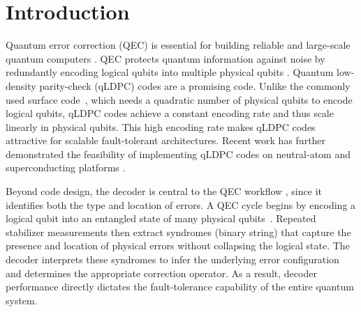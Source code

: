 \section{Introduction}

Quantum error correction (QEC) is essential for building reliable and large-scale quantum computers \cite{terhal2015quantum}. QEC protects quantum information against noise by redundantly encoding logical qubits into multiple physical qubits \cite{calderbank1996good}. Quantum low-density parity-check (qLDPC) codes are a promising code. Unlike the commonly used surface code~\cite{fowler2012surface,bonilla2021xzzx}, which needs a quadratic number of physical qubits to encode logical qubits, qLDPC codes achieve a constant encoding rate and thus scale linearly in physical qubits. This high encoding rate makes qLDPC codes attractive for scalable fault-tolerant architectures. Recent work has further demonstrated the feasibility of implementing qLDPC codes on neutral-atom and superconducting platforms \cite{xu2024constant,bbcode,wang2025demonstration}. 

Beyond code design, the decoder is central to the QEC workflow \cite{vittal2023astrea,alavisamani2024promatch,das2022lilliput,wu2025micro}, since it identifies both the type and location of errors. A QEC cycle begins by encoding a logical qubit into an entangled state of many physical qubits~\cite{knill1997theory,laflamme1996perfect}. Repeated stabilizer measurements then extract syndromes (binary string) that capture the presence and location of physical errors without collapsing the logical state. The decoder interprets these syndromes to infer the underlying error configuration and determines the appropriate correction operator. As a result, decoder performance directly dictates the fault-tolerance capability of the entire quantum system.



